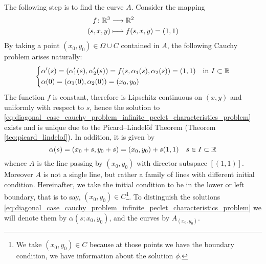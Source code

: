The following step is to find the curve $A$. Consider the mapping 
\begin{equation}
	\begin{aligned}
		f \colon \mathbb{R}^3 &\longrightarrow \mathbb{R}^2 \\
		(s,x,y) &\longmapsto f(s,x,y) = (1,1)
	\end{aligned}
\end{equation}
By taking a point $(x_0, y_0) \in \Omega \cup C$ contained in $A$, the following Cauchy
problem arises naturally:
\begin{equation} \label{eq:diagonal_case_cauchy_problem_infinite_peclet_characteristics_problem}
	\left\{
		\begin{aligned}
			&\alpha'(s) = 
			(\alpha_1'(s), \alpha_2'(s)) = 
			f(s,\alpha_1(s),\alpha_2(s)) =
			(1,1) & &\text{in } I \subset \mathbb{R} \\
			&\alpha(0) = 
			(\alpha_1(0), \alpha_2(0)) = 
			(x_0, y_0)
		\end{aligned}
	\right.
\end{equation}
The function $f$ is constant, therefore is Lipschitz continuous on $(x,y)$ and
uniformly with respect to $s$, hence the solution to
\eqref{eq:diagonal_case_cauchy_problem_infinite_peclet_characteristics_problem}
exists and is unique due to the Picard--Lindelöf Theorem (Theorem
\ref{teo:picard_lindelof}). In addition, it is given by
\begin{equation} \label{eq:diagonal_case_cauchy_problem_infinite_peclet_characteristics_solution}
	\alpha(s) = (x_0 + s, y_0 + s) = (x_0, y_0) + s(1, 1) \quad s \in I \subset \mathbb{R}
\end{equation}
whence $A$ is the line passing by $(x_0, y_0)$ with director subspace $[(1,
1)]$. Moreover $A$ is not a single line, but rather a family of lines with
different initial condition. Hereinafter, we take the initial condition to be in
the lower or left boundary, that is to say, $(x_0,y_0) \in C$\footnote{We take
$(x_0,y_0) \in C$ because at those points we have the boundary condition, \ie we
have information about the solution $\phi$.}. To distinguish the solutions
\eqref{eq:diagonal_case_cauchy_problem_infinite_peclet_characteristics_problem}
we will denote them by $\alpha(s; x_0, y_0)$, and the curves by $A_{(x_0,y_0)}$.

